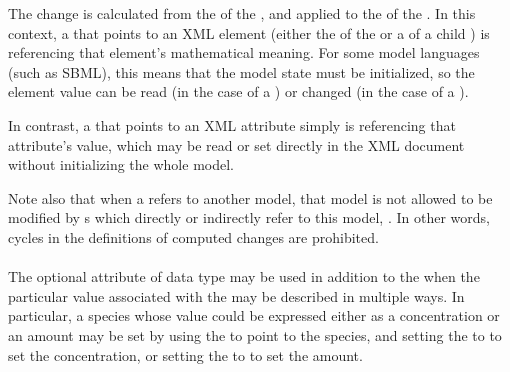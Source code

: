 \begin{blockChanged}

The change is calculated from the \Math of the \Calculation, and applied to the  of the \Change.  In this context, a  that points to an XML element (either the  of the \ComputeChange or a  of a child \Variable) is referencing that element's mathematical meaning.  For some model languages (such as SBML), this means that the model state must be initialized, so the element value can be read (in the case of a \Variable) or changed (in the case of a \ComputeChange).

In contrast, a  that points to an XML attribute simply is referencing that attribute's value, which may be read or set directly in the XML document without initializing the whole model.

\end{blockChanged}

Note also that when a  refers to another model, that model is not allowed to be modified by s which directly or indirectly refer to this model, . In other words, cycles in the definitions of computed changes are prohibited.  

\begin{blockChanged}
\paragraph*{}
\label{sec:cc_symbol}
The optional  attribute of data type  may be used in addition to the  when the particular value associated with the  may be described in multiple ways.  In particular, a species whose value could be expressed either as a concentration or an amount may be set by using the  to point to the species, and setting the  to  to set the concentration, or setting the  to  to set the amount.
\end{blockChanged}


